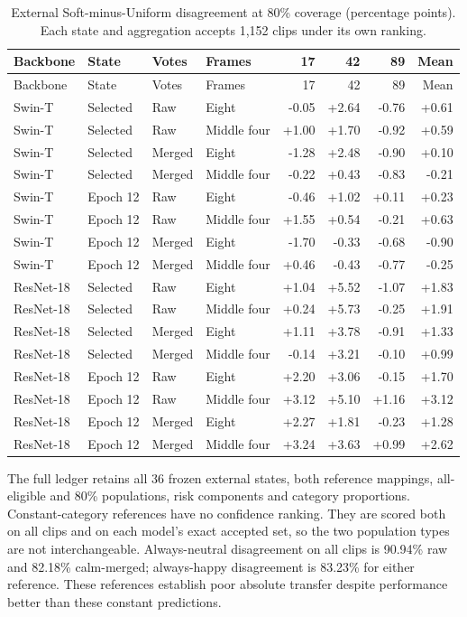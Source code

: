 \begingroup\small\setlength{\tabcolsep}{4pt}\setlength{\LTcapwidth}{\linewidth}\renewcommand{\arraystretch}{.97}
\begin{longtable}{llllrrrr}
\caption{External Soft-minus-Uniform disagreement at 80\% coverage (percentage points). Each state and aggregation accepts 1,152 clips under its own ranking.}\label{tab:aggregation-seeds}\\
\toprule Backbone & State & Votes & Frames & 17 & 42 & 89 & Mean\\\midrule\endfirsthead
\toprule Backbone & State & Votes & Frames & 17 & 42 & 89 & Mean\\\midrule\endhead
Swin-T & Selected & Raw & Eight & -0.05 & +2.64 & -0.76 & +0.61\\
Swin-T & Selected & Raw & Middle four & +1.00 & +1.70 & -0.92 & +0.59\\
Swin-T & Selected & Merged & Eight & -1.28 & +2.48 & -0.90 & +0.10\\
Swin-T & Selected & Merged & Middle four & -0.22 & +0.43 & -0.83 & -0.21\\
Swin-T & Epoch 12 & Raw & Eight & -0.46 & +1.02 & +0.11 & +0.23\\
Swin-T & Epoch 12 & Raw & Middle four & +1.55 & +0.54 & -0.21 & +0.63\\
Swin-T & Epoch 12 & Merged & Eight & -1.70 & -0.33 & -0.68 & -0.90\\
Swin-T & Epoch 12 & Merged & Middle four & +0.46 & -0.43 & -0.77 & -0.25\\
ResNet-18 & Selected & Raw & Eight & +1.04 & +5.52 & -1.07 & +1.83\\
ResNet-18 & Selected & Raw & Middle four & +0.24 & +5.73 & -0.25 & +1.91\\
ResNet-18 & Selected & Merged & Eight & +1.11 & +3.78 & -0.91 & +1.33\\
ResNet-18 & Selected & Merged & Middle four & -0.14 & +3.21 & -0.10 & +0.99\\
ResNet-18 & Epoch 12 & Raw & Eight & +2.20 & +3.06 & -0.15 & +1.70\\
ResNet-18 & Epoch 12 & Raw & Middle four & +3.12 & +5.10 & +1.16 & +3.12\\
ResNet-18 & Epoch 12 & Merged & Eight & +2.27 & +1.81 & -0.23 & +1.28\\
ResNet-18 & Epoch 12 & Merged & Middle four & +3.24 & +3.63 & +0.99 & +2.62\\
\bottomrule\end{longtable}\endgroup

The full ledger retains all 36 frozen external states, both reference mappings, all-eligible and 80\% populations, risk components and category proportions. Constant-category references have no confidence ranking. They are scored both on all clips and on each model's exact accepted set, so the two population types are not interchangeable. Always-neutral disagreement on all clips is 90.94\% raw and 82.18\% calm-merged; always-happy disagreement is 83.23\% for either reference. These references establish poor absolute transfer despite performance better than these constant predictions.
